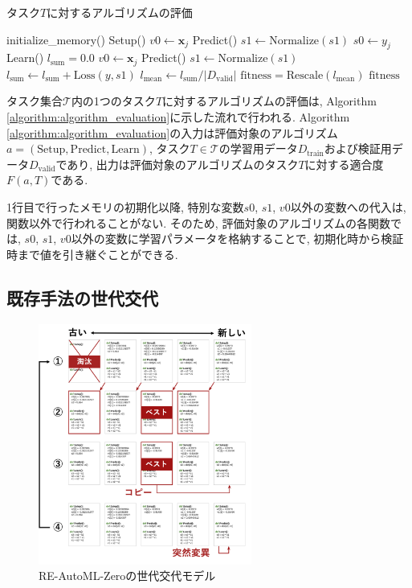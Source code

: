 \documentclass[a4paper,11pt,twocolumn]{jarticle}
\renewcommand{\Return}[1]{\State \textbf{return} #1}
\begin{document}
\begin{algorithm}[tb]
  \caption{タスク$T$に対するアルゴリズムの評価}
  \label{algorithm:algorithm_evaluation}
  \begin{algorithmic}[1]
    \State initialize\_memory()
    \State Setup()
    \State $v0 \leftarrow \bm{x}_j$
    \State Predict()
    \State $s1 \leftarrow \mathrm{Normalize}(s1)$
    \State $s0 \leftarrow y_j$
    \State Learn()
    \EndFor
    \EndFor
    \State $l_\mathrm{sum} = 0.0$
    \State $v0 \leftarrow \bm{x}_j$
    \State Predict()
    \State $s1 \leftarrow \mathrm{Normalize}(s1)$
    \State $l_\mathrm{sum} \leftarrow l_\mathrm{sum} + \mathrm{Loss}(y, s1)$
    \EndFor
    \State $ l_\mathrm{mean} \leftarrow l_\mathrm{sum} / \left|D_\mathrm{valid}\right|$
    \State $ \mathrm{fitness} = \mathrm{Rescale}(l_\mathrm{mean})$
    \Return $ \mathrm{fitness} $
  \end{algorithmic}
\end{algorithm}
タスク集合$\mathcal{T}$内の1つのタスク$T$に対するアルゴリズムの評価は, Algorithm \ref{algorithm:algorithm_evaluation}に示した流れで行われる. Algorithm \ref{algorithm:algorithm_evaluation}の入力は評価対象のアルゴリズム$a=(\mathrm{Setup}, \mathrm{Predict}, \mathrm{Learn})$, タスク$T \in \mathcal{T}$の学習用データ$D_\mathrm{train}$および検証用データ$D_\mathrm{valid}$であり, 出力は評価対象のアルゴリズムのタスク$T$に対する適合度$F(a,T)$である.

1行目で行ったメモリの初期化以降, 特別な変数$s0$, $s1$, $v0$以外の変数への代入は, 関数以外で行われることがない. そのため, 評価対象のアルゴリズムの各関数では, $s0$, $s1$, $v0$以外の変数に学習パラメータを格納することで, 初期化時から検証時まで値を引き継ぐことができる.

\subsection{既存手法の世代交代}\label{subsec:existing_problem:re}

\begin{figure}
  \centering
  \includegraphics[width=7cm]{re.png}
  \caption{RE-AutoML-Zero\cite{automl_zero}の世代交代モデル}
  \label{fig:regularized_evolution}
\end{figure}
\end{document}
